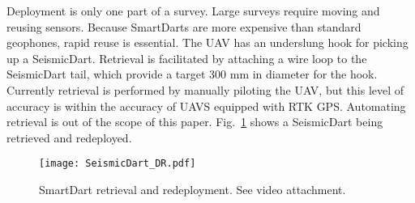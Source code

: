 Deployment is only one part of a survey. Large surveys require moving and reusing sensors.  
Because SmartDarts are more expensive than standard geophones, rapid reuse is essential.
The UAV has an underslung hook for picking up a SeismicDart.
Retrieval is facilitated by attaching a wire loop to the SeismicDart tail, which provide a target 300 mm in diameter for the hook.
Currently retrieval is performed by manually piloting the UAV, but this level of accuracy is within the accuracy of UAVS equipped with RTK GPS.
Automating retrieval is out of the scope of this paper.
Fig.~\ref{fig:SeismicDart_DR} shows a SeismicDart being retrieved and redeployed.


\begin{figure} \centering
  {\texttt{[image: SeismicDart\_DR.pdf]}}
 \caption{SmartDart retrieval and redeployment.  See video attachment. 
 \label{fig:SeismicDart_DR}}
\end{figure}
 